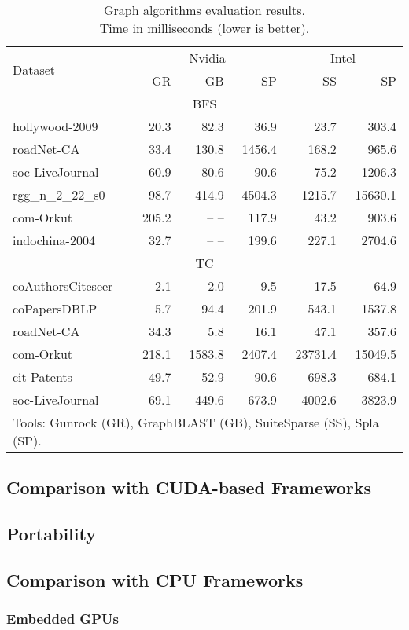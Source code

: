 \begin{table}[tbp]
\caption{Graph algorithms evaluation results.\\Time in milliseconds (lower is better).} 
\begin{center}
    \begin{tabular}{|l|r|r|r|r|r|}
    \hline
    \multirow{2}{*}{Dataset} & \multicolumn{3}{c|}{Nvidia} & \multicolumn{2}{c|}{Intel} \\
    \cline{2-6}
    & GR & GB & SP & SS & SP \\
    \hline
    \hline
    \multicolumn{6}{|c|}{BFS} \\
    \hline
    \rowcolor{black!10} hollywood-2009    &  20.3 &  82.3 &   36.9 &   23.7 &   303.4 \\
    \rowcolor{black!2 } roadNet-CA        &  33.4 & 130.8 & 1456.4 &  168.2 &   965.6 \\
    \rowcolor{black!10} soc-LiveJournal   &  60.9 &  80.6 &   90.6 &   75.2 &  1206.3 \\
    \rowcolor{black!2 } rgg\_n\_2\_22\_s0 &  98.7 & 414.9 & 4504.3 & 1215.7 & 15630.1 \\
    \rowcolor{black!10} com-Orkut         & 205.2 & -- -- &  117.9 &   43.2 &   903.6 \\
    \rowcolor{black!2 } indochina-2004    &  32.7 & -- -- &  199.6 &  227.1 &  2704.6 \\
    \hline
    \hline
    \multicolumn{6}{|c|}{TC} \\
    \hline
    \rowcolor{black!10} coAuthorsCiteseer &   2.1 &    2.0 &    9.5 &    17.5 &    64.9 \\
    \rowcolor{black!2 } coPapersDBLP      &   5.7 &   94.4 &  201.9 &   543.1 &  1537.8 \\
    \rowcolor{black!10} roadNet-CA        &  34.3 &    5.8 &   16.1 &    47.1 &   357.6 \\
    \rowcolor{black!2 } com-Orkut         & 218.1 & 1583.8 & 2407.4 & 23731.4 & 15049.5 \\
    \rowcolor{black!10} cit-Patents       &  49.7 &   52.9 &   90.6 &   698.3 &   684.1 \\
    \rowcolor{black!2 } soc-LiveJournal   &  69.1 &  449.6 &  673.9 &  4002.6 &  3823.9 \\
    \hline
    \hline
    \multicolumn{6}{l}{Tools: Gunrock (GR), GraphBLAST (GB), SuiteSparse (SS), Spla (SP).} \\
    \end{tabular}
    \label{results}
\end{center}
\end{table}
 
\subsection{Comparison with CUDA-based Frameworks}
\subsection{Portability}
\subsection{Comparison with CPU Frameworks}
\subsubsection{Embedded GPUs}